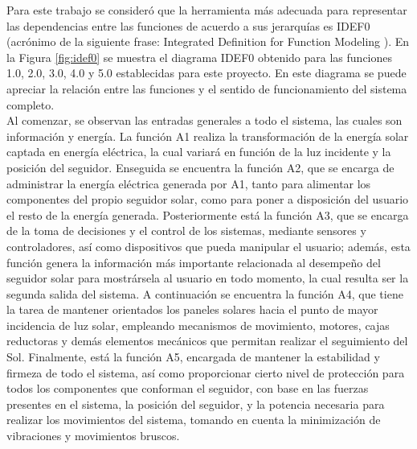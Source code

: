 \newpage
Para este trabajo se consideró que la herramienta más adecuada para representar las dependencias entre las funciones de acuerdo a sus jerarquías es IDEF0 (acrónimo de la siguiente frase: Integrated Definition for Function Modeling \cite{DC4}). En la Figura \ref{fig:idef0} se muestra el diagrama IDEF0 obtenido para las funciones 1.0, 2.0, 3.0, 4.0 y 5.0 establecidas para este proyecto. En este diagrama se puede apreciar la relación entre las funciones y el sentido de funcionamiento del sistema completo.\\

Al comenzar, se observan las entradas generales a todo el sistema, las cuales son información y energía. La función A1 realiza la transformación de la energía solar captada en energía eléctrica, la cual variará en función de la luz incidente y la posición del seguidor. Enseguida se encuentra la función A2, que se encarga de administrar la energía eléctrica generada por A1, tanto para alimentar los componentes del propio seguidor solar, como para poner a disposición del usuario el resto de la energía generada. Posteriormente está la función A3, que se encarga de la toma de decisiones y el control de los sistemas, mediante sensores y controladores, así como dispositivos que pueda manipular el usuario; además, esta función genera la información más importante relacionada al desempeño del seguidor solar para mostrársela al usuario en todo momento, la cual resulta ser la segunda salida del sistema. A continuación se encuentra la función A4, que tiene la tarea de mantener orientados los paneles solares hacia el punto de mayor incidencia de luz solar, empleando mecanismos de movimiento, motores, cajas reductoras y demás elementos mecánicos que permitan realizar el seguimiento del Sol. Finalmente, está la función A5, encargada de mantener la estabilidad y firmeza de todo el sistema, así como proporcionar cierto nivel de protección para todos los componentes que conforman el seguidor, con base en las fuerzas presentes en el sistema, la posición del seguidor, y la potencia necesaria para realizar los movimientos del sistema, tomando en cuenta la minimización de vibraciones y movimientos bruscos. 


